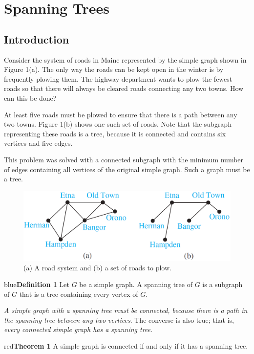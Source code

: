 \documentclass{article}
\newenvironment{definition}[1]{\begin{mybox}{blue}{\textbf{Definition #1}}}{\end{mybox}}
\newenvironment{theorem}[1]{\begin{mybox}{red}{\textbf{Theorem #1}}}{\end{mybox}}
\begin{document}
\section{Spanning Trees}
\setcounter{figure}{0}
\setcounter{algorithm}{0}

\subsection{Introduction}

Consider the system of roads in Maine represented by the simple graph shown in Figure 1(a). The only way the roads can be kept open in the winter is by frequently plowing them. The highway department wants to plow the fewest roads so that there will always be cleared roads connecting any two towns. How can this be done?

At least five roads must be plowed to ensure that there is a path between any two towns. Figure 1(b) shows one such set of roads. Note that the subgraph representing these roads is a tree, because it is connected and contains six vertices and five edges. 

This problem was solved with a connected subgraph with the minimum number of edges containing all vertices of the original simple graph. Such a graph must be a tree.

\begin{figure}[h!]
    \centering
    \includegraphics[width=.7\textwidth]{img/ch11.4-figure1.png}
    \caption{(a) A road system and (b) a set of
roads to plow.}
    \label{fig:my_label}
\end{figure}

\begin{definition}
{1}
Let $G$ be a simple graph. A spanning tree of $G$ is a subgraph of $G$ that is a tree containing every vertex of $G$.
\end{definition}

\textit{A simple graph with a spanning tree must be connected, because there is a path in the spanning tree between any two vertices}. The converse is also true; that is, \textit{every connected simple graph has a spanning tree}.

\begin{theorem}
{1}
A simple graph is connected if and only if it has a spanning tree.
\end{theorem}
\end{document}
